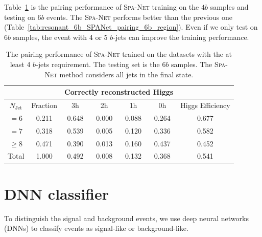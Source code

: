 \documentclass[12pt]{article}
\begin{document}
    Table~\ref{tab:resonant_4b_SPANet_pairing_6b_region} is the pairing performance of \textsc{Spa-Net} training on the $4b$ samples and testing on $6b$ events. The \textsc{Spa-Net} performs better than the previous one (Table~\ref{tab:resonant_6b_SPANet_pairing_6b_region}). Even if we only test on $6b$ samples, the event with 4 or 5 $b$-jets can improve the training performance.
    \begin{table}[htpb]
		\centering
        \caption{The pairing performance of \textsc{Spa-Net} trained on the datasets with the at least 4 $b$-jets requirement. The testing set is the $6b$ samples. The \textsc{Spa-Net} method considers all jets in the final state.}
		\label{tab:resonant_4b_SPANet_pairing_6b_region}
		\begin{tabular}{c|c|cccc|c}
			\multicolumn{1}{l|}{} &          & \multicolumn{4}{c|}{Correctly reconstructed Higgs} & \multicolumn{1}{l}{} \\ \hline
			$N_\text{Jet}$        & Fraction & 3h          & 2h         & 1h         & 0h         & Higgs Efficiency     \\ \hline
			$=6$                  & 0.211 & 0.648 & 0.000 & 0.088 & 0.264 & 0.677                \\
			$=7$                  & 0.318 & 0.539 & 0.005 & 0.120 & 0.336 & 0.582                \\
			$\ge 8$               & 0.471 & 0.390 & 0.013 & 0.160 & 0.437 & 0.452                \\ \hline
			Total                 & 1.000 & 0.492 & 0.008 & 0.132 & 0.368 & 0.541               
		\end{tabular}
	\end{table}
\section{DNN classifier}%
\label{sec:dnn_classifier}
    To distinguish the signal and background events, we use deep neural networks (DNNs) to classify events as signal-like or background-like.
\end{document}
